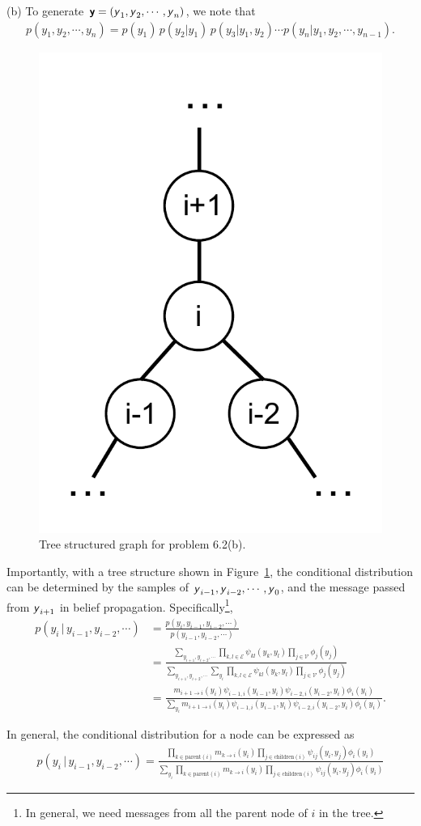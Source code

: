 \documentclass{article}
\newcommand{\s}[1]{\textsf{\textit{#1}}}
\newcommand{\bs}[1]{\textsf{\textbf{#1}}}
\begin{document}
\noindent
(b) To generate $\bs{y} = (\s{y}_1, \s{y}_2, \cdots, \s{y}_n)$, we note that
\begin{align*}
	p(y_1, y_2, \cdots, y_n) = p(y_1)\, p (y_2 | y_1)\, p(y_3 | y_1, y_2) \cdots p(y_n | y_1, y_2, \cdots, y_{n-1}).
\end{align*}
%
\begin{figure}[h!]
  \centering
  \vspace{-0.3cm}
  \includegraphics[width=0.2\columnwidth]{62b.pdf}
    \vspace{-0.1cm}
  \caption{Tree structured graph for problem 6.2(b).}
  \label{f:62b}
\end{figure}
%

Importantly, with a tree structure shown in Figure~\ref{f:62b}, the conditional
distribution can be determined by the samples of
$\s{y}_{i-1}, \s{y}_{i-2}, \cdots, \s{y}_{0}$, and the message passed from $\s{y}_{i+1}$
in belief propagation. Specifically\footnote{In general, we need messages from all the parent node of $i$ in the tree.},
%
\begin{align*}
	p(y_i \,\big|\, y_{i-1}, y_{i-2}, \cdots) &= \frac{p(y_i, y_{i-1}, y_{i-2}, \cdots)}{p(y_{i-1}, y_{i-2}, \cdots)}\\
	&=\frac{\sum_{y_{i+1}, y_{i+2}, \cdots} \prod_{k, l \in \mathscr{E}} \psi_{kl}(y_k, y_l)\prod_{j\in\mathscr{V}}\phi_j(y_j)}
	{\sum_{y_{i+1}, y_{i+2}, \cdots}\sum_{y_{i}}\prod_{k, l \in \mathscr{E}}\psi_{kl}(y_k, y_l)\prod_{j\in\mathscr{V}}\phi_j(y_j)} \\ 
	&= \frac{m_{i+1\to i}(y_i) \psi_{i-1, i}(y_{i-1}, y_i)\psi_{i-2, i}(y_{i-2}, y_i)\phi_i(y_i)}{\sum_{y_{i}}m_{i+1\to i}(y_i) \psi_{i-1, i}(y_{i-1}, y_i)\psi_{i-2, i}(y_{i-2}, y_i)\phi_i(y_i)}.
\end{align*}
%

In general, the conditional distribution for a node can be expressed as
\begin{align}
	p(y_i \,\big|\, y_{i-1}, y_{i-2}, \cdots) = \frac{\prod_{k \in \text{parent}(i)}m_{k\to i}(y_i)\prod_{j \in \text{children}(i)}\psi_{ij}(y_i, y_j)\phi_i(y_i)}{\sum_{y_{i}}\prod_{k \in \text{parent}(i)}m_{k\to i}(y_i)\prod_{j \in \text{children}(i)}\psi_{ij}(y_i, y_j)\phi_i(y_i)} \label{eq:62_conditional_dist}
\end{align}
\end{document}
